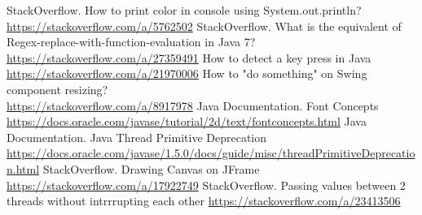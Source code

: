 \documentclass{article}
\begin{document}
\begin{thebibliography}{9}
         StackOverflow. How to print color in console using System.out.println? \\
        \url{https://stackoverflow.com/a/5762502}
         StackOverflow. What is the equivalent of Regex-replace-with-function-evaluation in Java 7? \url{https://stackoverflow.com/a/27359491}
         How to detect a key press in Java \\
        \url{https://stackoverflow.com/a/21970006}
         How to "do something" on Swing component resizing? \\
        \url{https://stackoverflow.com/a/8917978}
         Java Documentation. Font Concepts \\
        \url{https://docs.oracle.com/javase/tutorial/2d/text/fontconcepts.html}
         Java Documentation. Java Thread Primitive Deprecation \url{https://docs.oracle.com/javase/1.5.0/docs/guide/misc/threadPrimitiveDeprecation.html}
         StackOverflow. Drawing Canvas on JFrame \\
        \url{https://stackoverflow.com/a/17922749}
         StackOverflow. Passing values between 2 threads without intrrrupting each other \url{https://stackoverflow.com/a/23413506}
    \end{thebibliography}  
    
    \newpage
\end{document}
